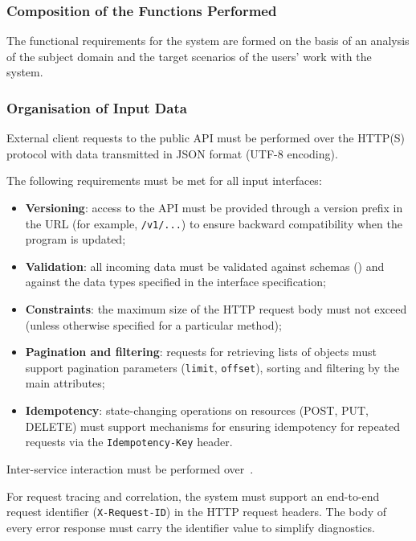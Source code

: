 \documentclass[12pt,a4paper]{extarticle}
\begin{document}
\subsubsection{Composition of the Functions Performed}



\clearpage

The functional requirements for the system are formed on the basis of an analysis of the subject domain and the target scenarios of the users' work with the system.

\subsubsection{Organisation of Input Data}
\label{sec:input_data}

\begin{hseExample}
External client requests to the public API must be performed over the HTTP(S) protocol with data transmitted in JSON format (UTF-8 encoding).

The following requirements must be met for all input interfaces:
\begin{itemize}[nosep, leftmargin=1.25cm]
    \item \textbf{Versioning}: access to the API must be provided through a version prefix in the URL (for example, \texttt{/v1/...}) to ensure backward compatibility when the program is updated;
    \item \textbf{Validation}: all incoming data must be validated against schemas () and against the data types specified in the interface specification;
    \item \textbf{Constraints}: the maximum size of the HTTP request body must not exceed  (unless otherwise specified for a particular method);
    \item \textbf{Pagination and filtering}: requests for retrieving lists of objects must support pagination parameters (\texttt{limit}, \texttt{offset}), sorting and filtering by the main attributes;
    \item \textbf{Idempotency}: state-changing operations on resources (POST, PUT, DELETE) must support mechanisms for ensuring idempotency for repeated requests via the \texttt{Idempotency-Key} header.
\end{itemize}

Inter-service interaction must be performed over~.

For request tracing and correlation, the system must support an end-to-end request identifier (\texttt{X-Request-ID}) in the HTTP request headers. The body of every error response must carry the identifier value to simplify diagnostics.
\end{hseExample}
\end{document}
